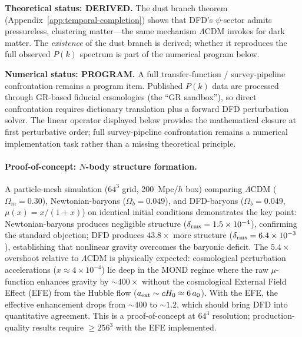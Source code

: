 \textbf{Theoretical status: DERIVED.} The dust branch theorem (Appendix~\ref{app:temporal-completion}) shows that DFD's $\psi$-sector admits pressureless, clustering matter---the same mechanism $\Lambda$CDM invokes for dark matter.  The \emph{existence} of the dust branch is derived; whether it reproduces the full observed $P(k)$ spectrum is part of the numerical program below.

\textbf{Numerical status: PROGRAM.} A full transfer-function / survey-pipeline confrontation remains a program item. Published $P(k)$ data are processed through GR-based fiducial cosmologies (the ``GR sandbox''), so direct confrontation requires dictionary translation plus a forward DFD perturbation solver.  The linear operator displayed below provides the mathematical closure at first perturbative order; full survey-pipeline confrontation remains a numerical implementation task rather than a missing theoretical principle.

\paragraph{Proof-of-concept: $N$-body structure formation.}
A particle-mesh simulation ($64^3$ grid, 200~Mpc/$h$ box) comparing
$\Lambda$CDM ($\Omega_m = 0.30$), Newtonian-baryons ($\Omega_b = 0.049$),
and DFD-baryons ($\Omega_b = 0.049$, $\mu(x) = x/(1+x)$) on identical
initial conditions demonstrates the key point: Newtonian-baryons produces
negligible structure ($\delta_{\rm rms} = 1.5 \times 10^{-4}$),
confirming the standard objection; DFD produces $43.8\times$ more
structure ($\delta_{\rm rms} = 6.4 \times 10^{-3}$), establishing that
nonlinear gravity overcomes the baryonic deficit.  The $5.4\times$
overshoot relative to $\Lambda$CDM is physically expected: cosmological
perturbation accelerations ($x \approx 4 \times 10^{-4}$) lie deep in
the MOND regime where the raw $\mu$-function enhances gravity by
$\sim\!400\times$ without the cosmological External Field Effect (EFE)
from the Hubble flow ($a_{\rm ext} \sim cH_0 \approx 6\,a_0$).
With the EFE, the effective enhancement drops from $\sim\!400$ to
$\sim\!1.2$, which should bring DFD into quantitative agreement.
This is a proof-of-concept at $64^3$ resolution; production-quality
results require $\geq 256^3$ with the EFE implemented.

